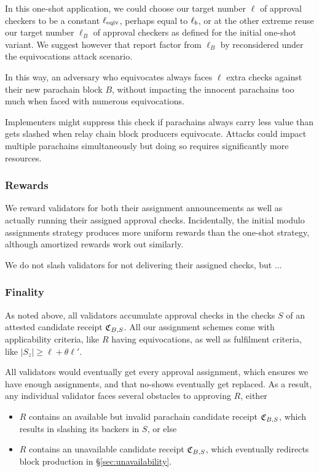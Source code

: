 In this one-shot application, we could choose our target number $\ell$ of approval checkers to be a constant $\ell_{\mathrm{eqiv}}$, perhaps equal to $\ell_b$, or at the other extreme reuse our target number $\ell_B$ of approval checkers as defined for the initial one-shot variant.  We suggest however that report factor from $\ell_B$ by reconsidered under the equivocations attack scenario.

In this way, an adversary who equivocates always faces $\ell$ extra checks against their new parachain block $B$, without impacting the innocent parachains too much when faced with numerous equivocations.

Implementers might suppress this check if parachains always carry less value than gets slashed when relay chain block producers equivocate.  Attacks could impact multiple parachains simultaneously but doing so requires significantly more resources.

\subsubsection{Rewards}

We reward validators for both their assignment announcements as well as actually running their assigned approval checks.  Incidentally, the initial modulo assignments strategy produces more uniform rewards than the one-shot strategy, although amortized rewards work out similarly.  

We do not slash validators for not delivering their assigned checks, but ... 


\subsubsection{Finality} 
\label{sec:finality}

As noted above, all validators accumulate approval checks in the checks $S$ of an attested candidate receipt $\mathfrak{C}_{B,S}$.  All our assignment schemes come with applicability criteria, like $R$ having equivocations, as well as fulfilment criteria, like $|S_z| \ge \ell + \theta \ell'$.  

All validators would eventually get every approval assignment, which ensures we have enough assignments, and that no-shows eventually get replaced.  As a result, any individual validator faces several obstacles to approving $R$, either
\begin{itemize}
\item $R$ contains an available but invalid parachain candidate receipt $\mathfrak{C}_{B,S}$, which results in slashing its backers in $S$, or else
\item $R$ contains an unavailable candidate receipt $\mathfrak{C}_{B,S}$, which eventually redirects block production in \S\ref{sec:unavailability}. 
\end{itemize}

